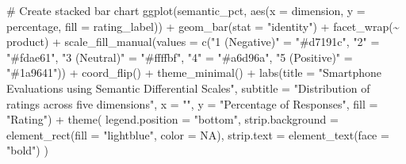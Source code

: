 \documentclass[
  letterpaper,
  DIV=11,
  numbers=noendperiod]{scrartcl}
\newenvironment{Shaded}{\begin{snugshade}}{\end{snugshade}}
\newcommand{\AttributeTok}[1]{\textcolor[rgb]{0.40,0.45,0.13}{#1}}
\newcommand{\CommentTok}[1]{\textcolor[rgb]{0.37,0.37,0.37}{#1}}
\newcommand{\ConstantTok}[1]{\textcolor[rgb]{0.56,0.35,0.01}{#1}}
\newcommand{\FunctionTok}[1]{\textcolor[rgb]{0.28,0.35,0.67}{#1}}
\newcommand{\NormalTok}[1]{\textcolor[rgb]{0.00,0.23,0.31}{#1}}
\newcommand{\OtherTok}[1]{\textcolor[rgb]{0.00,0.23,0.31}{#1}}
\newcommand{\SpecialCharTok}[1]{\textcolor[rgb]{0.37,0.37,0.37}{#1}}
\newcommand{\StringTok}[1]{\textcolor[rgb]{0.13,0.47,0.30}{#1}}
\begin{document}
\begin{Shaded}
\begin{Highlighting}[]
\CommentTok{\# Create stacked bar chart}
\FunctionTok{ggplot}\NormalTok{(semantic\_pct, }\FunctionTok{aes}\NormalTok{(}\AttributeTok{x =}\NormalTok{ dimension, }\AttributeTok{y =}\NormalTok{ percentage, }\AttributeTok{fill =}\NormalTok{ rating\_label)) }\SpecialCharTok{+}
  \FunctionTok{geom\_bar}\NormalTok{(}\AttributeTok{stat =} \StringTok{"identity"}\NormalTok{) }\SpecialCharTok{+}
  \FunctionTok{facet\_wrap}\NormalTok{(}\SpecialCharTok{\textasciitilde{}}\NormalTok{ product) }\SpecialCharTok{+}
  \FunctionTok{scale\_fill\_manual}\NormalTok{(}\AttributeTok{values =} \FunctionTok{c}\NormalTok{(}\StringTok{"1 (Negative)"} \OtherTok{=} \StringTok{"\#d7191c"}\NormalTok{,}
                               \StringTok{"2"} \OtherTok{=} \StringTok{"\#fdae61"}\NormalTok{,}
                               \StringTok{"3 (Neutral)"} \OtherTok{=} \StringTok{"\#ffffbf"}\NormalTok{,}
                               \StringTok{"4"} \OtherTok{=} \StringTok{"\#a6d96a"}\NormalTok{,}
                               \StringTok{"5 (Positive)"} \OtherTok{=} \StringTok{"\#1a9641"}\NormalTok{)) }\SpecialCharTok{+}
  \FunctionTok{coord\_flip}\NormalTok{() }\SpecialCharTok{+}
  \FunctionTok{theme\_minimal}\NormalTok{() }\SpecialCharTok{+}
  \FunctionTok{labs}\NormalTok{(}\AttributeTok{title =} \StringTok{"Smartphone Evaluations using Semantic Differential Scales"}\NormalTok{,}
       \AttributeTok{subtitle =} \StringTok{"Distribution of ratings across five dimensions"}\NormalTok{,}
       \AttributeTok{x =} \StringTok{""}\NormalTok{,}
       \AttributeTok{y =} \StringTok{"Percentage of Responses"}\NormalTok{,}
       \AttributeTok{fill =} \StringTok{"Rating"}\NormalTok{) }\SpecialCharTok{+}
  \FunctionTok{theme}\NormalTok{(}
    \AttributeTok{legend.position =} \StringTok{"bottom"}\NormalTok{,}
    \AttributeTok{strip.background =} \FunctionTok{element\_rect}\NormalTok{(}\AttributeTok{fill =} \StringTok{"lightblue"}\NormalTok{, }\AttributeTok{color =} \ConstantTok{NA}\NormalTok{),}
    \AttributeTok{strip.text =} \FunctionTok{element\_text}\NormalTok{(}\AttributeTok{face =} \StringTok{"bold"}\NormalTok{)}
\NormalTok{  )}
\end{Highlighting}
\end{Shaded}
\end{document}
